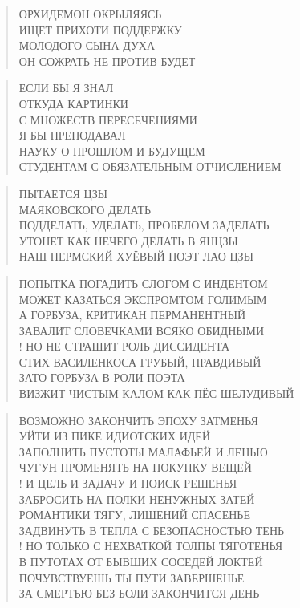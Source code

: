 \poemtitle{***}
\begin{verse}
ОРХИДЕМОН ОКРЫЛЯЯСЬ\\
ИЩЕТ ПРИХОТИ ПОДДЕРЖКУ\\
МОЛОДОГО СЫНА ДУХА\\
ОН СОЖРАТЬ НЕ ПРОТИВ БУДЕТ
\end{verse}

\poemtitle{***}
\begin{verse}
ЕСЛИ БЫ Я ЗНАЛ\\
    ОТКУДА КАРТИНКИ \\
        С МНОЖЕСТВ ПЕРЕСЕЧЕНИЯМИ\\
Я БЫ ПРЕПОДАВАЛ\\
    НАУКУ О ПРОШЛОМ И БУДУЩЕМ\\
        СТУДЕНТАМ С ОБЯЗАТЕЛЬНЫМ ОТЧИСЛЕНИЕМ
\end{verse}

\poemtitle{***}
\begin{verse}
ПЫТАЕТСЯ ЦЗЫ\\
МАЯКОВСКОГО ДЕЛАТЬ\\
ПОДДЕЛАТЬ, УДЕЛАТЬ, ПРОБЕЛОМ ЗАДЕЛАТЬ\\
УТОНЕТ КАК НЕЧЕГО ДЕЛАТЬ В ЯНЦЗЫ\\
НАШ ПЕРМСКИЙ ХУЁВЫЙ ПОЭТ ЛАО ЦЗЫ
\end{verse}

\poemtitle{***}
\begin{verse}
ПОПЫТКА ПОГАДИТЬ СЛОГОМ С ИНДЕНТОМ\\
МОЖЕТ КАЗАТЬСЯ ЭКСПРОМТОМ ГОЛИМЫМ\\
А ГОРБУЗА, КРИТИКАН ПЕРМАНЕНТНЫЙ\\
ЗАВАЛИТ СЛОВЕЧКАМИ ВСЯКО ОБИДНЫМИ\\!
НО НЕ СТРАШИТ РОЛЬ ДИССИДЕНТА\\
СТИХ ВАСИЛЕНКОСА ГРУБЫЙ, ПРАВДИВЫЙ\\
ЗАТО ГОРБУЗА В РОЛИ ПОЭТА\\
ВИЗЖИТ ЧИСТЫМ КАЛОМ КАК ПЁС ШЕЛУДИВЫЙ
\end{verse}

\poemtitle{***}
\begin{verse}
ВОЗМОЖНО ЗАКОНЧИТЬ ЭПОХУ ЗАТМЕНЬЯ\\
УЙТИ ИЗ ПИКЕ ИДИОТСКИХ ИДЕЙ\\
ЗАПОЛНИТЬ ПУСТОТЫ МАЛАФЬЕЙ И ЛЕНЬЮ\\
ЧУГУН ПРОМЕНЯТЬ НА ПОКУПКУ ВЕЩЕЙ\\!
И ЦЕЛЬ И ЗАДАЧУ И ПОИСК РЕШЕНЬЯ\\
ЗАБРОСИТЬ НА ПОЛКИ НЕНУЖНЫХ ЗАТЕЙ\\
РОМАНТИКИ ТЯГУ, ЛИШЕНИЙ СПАСЕНЬЕ\\
ЗАДВИНУТЬ В ТЕПЛА С БЕЗОПАСНОСТЬЮ ТЕНЬ\\!
НО ТОЛЬКО С НЕХВАТКОЙ ТОЛПЫ ТЯГОТЕНЬЯ\\
В ПУТОТАХ ОТ БЫВШИХ СОСЕДЕЙ ЛОКТЕЙ\\
ПОЧУВСТВУЕШЬ ТЫ ПУТИ ЗАВЕРШЕНЬЕ\\
ЗА СМЕРТЬЮ БЕЗ БОЛИ ЗАКОНЧИТСЯ ДЕНЬ
\end{verse}

